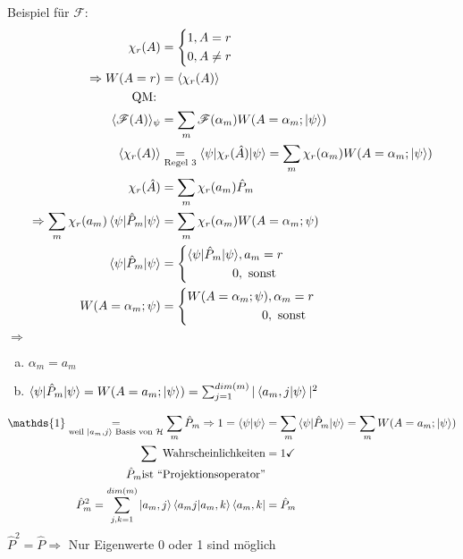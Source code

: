 \begin{enumerate}[1.]
\begin{enumerate}[(a)]
			Beispiel für $\mathscr{F}$:
				\begin{align*}
					\chi_r (A) &= 
					\left\{
					\begin{aligned}
						1&, A = r \\
						0&, A \neq r
					\end{aligned}
					\right. \\
					\Rightarrow W (A = r) &= \langle {\chi_r (A)} \rangle \\
					\text{QM: } \\
					\langle {\mathscr{F}(A)} \rangle_\psi &= \sum_m \mathscr{F}(\alpha_m) W(A = \alpha_m; \ket{\psi}) \\
					\langle {\chi_r(A)} \rangle &\underset{\text{Regel 3}}{=}
					\braket{\psi | \chi_r(\hat{A}) | \psi} = \sum_m \chi_r (\alpha_m) W(A = \alpha_m ; \ket{\psi}) \\
					\chi_r (\hat{A}) &= \sum_m \chi_r (a_m) \hat{P}_m \\
					\Rightarrow \sum_m \chi_r (a_m) \braket{\psi | \hat{P}_m | \psi} 
					&= \sum_m \chi_r (\alpha_m) W(A = \alpha_m; \psi) \\
					\braket{\psi | \hat{P}_m | \psi} &=
					\left\{
					\begin{aligned}
						\braket{\psi | \hat{P}_m | \psi} &, a_m = r \\
						0 &, \text{ sonst}
					\end{aligned}
					\right. \\
					W(A = \alpha_m; \psi) &=
					\left\{
					\begin{aligned}
						W(A = \alpha_m; \psi) &, \alpha_m = r \\
						0 &, \text{ sonst}
					\end{aligned}
					\right.
				\end{align*}
				$\Rightarrow$
				\begin{enumerate}[(a)] 
					\item $\alpha_m = a_m$
					\item $\braket{\psi | \hat{P}_m | \psi} = 
					W(A = a_m ; \ket{\psi}) = 
					\sum_{j = 1}^{dim(m)} |\braket{a_m, j | \psi}|^2$
				\end{enumerate}
				\begin{align*}
				\mathds{1} \underset{\text{weil } \ket{a_m, j} \text{ Basis von }\Hil}{=}
				\sum_m \hat{P}_m \Rightarrow
				1 = \braket{\psi | \psi} &= \sum_m \braket{\psi | \hat{P}_m | \psi} 
				= \sum_m W(A = a_m ; \ket{\psi}) \\
				\sum \text{ Wahrscheinlichkeiten} &= 1 \checkmark \\
				\hat{P}_m \text{ist ``Projektionsoperator''}& \\
				\hat{P}_m^2 = \sum_{j, k = 1}^{dim(m)} \ket{a_m, j} \braket{a_m j | a_m, k} \bra{a_m, k} &= \hat{P}_m
				\end{align*}
				$\hat{P}^2 = \hat{P} \Rightarrow$ Nur Eigenwerte 0 oder 1 sind möglich
		\end{enumerate}
	\end{enumerate}	
